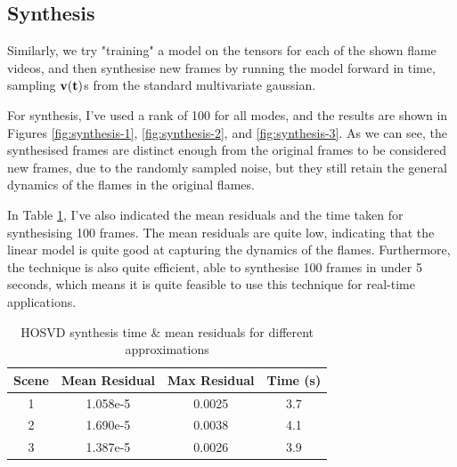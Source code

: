\documentclass{article}
\begin{document}
\subsection{Synthesis}
Similarly, we try "training" a model on the tensors for each of the shown flame videos, and then synthesise new frames by running the model forward in time, sampling $\bf v(t)$s from the standard multivariate gaussian.\bigskip

For synthesis, I've used a rank of 100 for all modes, and the results are shown in Figures \ref{fig:synthesis-1}, \ref{fig:synthesis-2}, and \ref{fig:synthesis-3}. As we can see, the synthesised frames are distinct enough from the original frames to be considered new frames, due to the randomly sampled noise, but they still retain the general dynamics of the flames in the original flames. \bigskip

In Table \ref{tab:synthesis}, I've also indicated the mean residuals and the time taken for synthesising 100 frames. The mean residuals are quite low, indicating that the linear model is quite good at capturing the dynamics of the flames. Furthermore, the technique is also quite efficient, able to synthesise 100 frames in under 5 seconds, which means it is quite feasible to use this technique for real-time applications.\bigskip

\begin{table}
	\centering
	\begin{tabular}{|c|c|c|c|}
		\hline \textbf{Scene} & \textbf{Mean Residual} & \textbf{Max Residual} & \textbf{Time (s)}\\
		\hline 1 & 1.058e-5 & 0.0025 & 3.7\\
		\hline 2 & 1.690e-5 & 0.0038 & 4.1\\
		\hline 3 & 1.387e-5 & 0.0026 & 3.9\\
		\hline
	\end{tabular}
	\caption{HOSVD synthesis time \& mean residuals for different approximations}
	\label{tab:synthesis}
\end{table}
\end{document}
